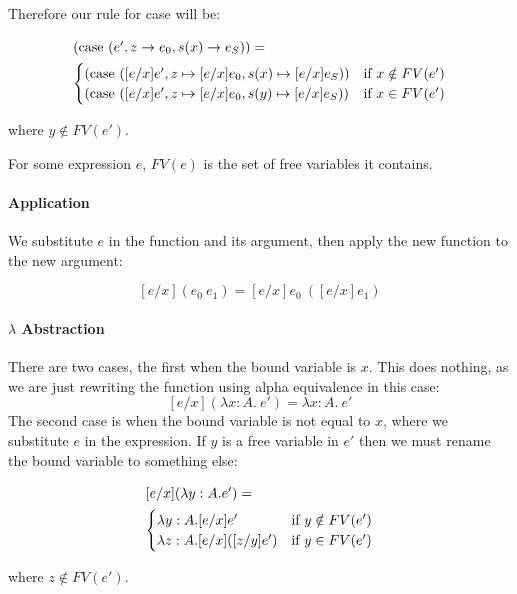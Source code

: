 Therefore our rule for case will be:

\begin{minipage}{4in}
\begin{align*}
\intertext{$(\operatorname{case} \ (e', z \to e_0, s(x) \to e_S))=$}
  \begin{cases}
            (\operatorname{case} \ ([e/x]e', z \mapsto [e/x]e_0, s(x) \mapsto [e/x]e_S)) & \text{if } x \notin FV(e')  \\
            (\operatorname{case} \ ([e/x]e', z \mapsto [e/x]e_0, s(y) \mapsto [e/x]e_S)) & \text{if } x \in FV(e')
  \end{cases}
\end{align*} 
\end{minipage}

where $y \notin FV(e')$. 

For some expression $e$, $FV(e)$ is the set of free variables it contains.

\paragraph{Application} We substitute $e$ in the function and its argument, then apply the new function to the new argument:

\[ [e/x] (e_0 \ e_1) = [e/x]e_0 \ ([e/x]e_1) \]

\paragraph{$\lambda$ Abstraction} There are two cases, the first when the bound variable is $x$. This does nothing, as we are just rewriting the function using alpha equivalence in this case:
\[ [e/x](\lambda x:A. \ e') = \lambda x:A. \ e' \]
The second case is when the bound variable is not equal to $x$, where we substitute $e$ in the expression. If $y$ is a free variable in $e'$ then we must rename the bound variable to something else:

\begin{minipage}{4in}
\begin{align*}
\intertext{$[e/x](\lambda y:A.e')=$}
  \begin{cases}
            \lambda y:A. [e/x]e' & \text{if } y \notin FV(e')  \\
           \lambda z:A. [e/x]([z/y]e') & \text{if } y \in FV(e')
  \end{cases}
\end{align*} 
\end{minipage}

where $z \notin FV(e')$.

